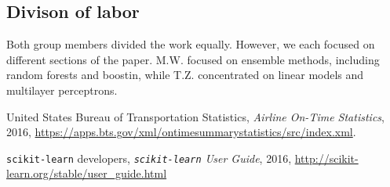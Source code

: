 \documentclass{article}
\begin{document}
\begin{multicols}{2}
\section{Divison of labor}

Both group members divided the work equally.
However, we each focused on different sections of the paper.
M.W. focused on ensemble methods, including random forests and boostin,
while T.Z. concentrated on linear models and multilayer perceptrons.

\begin{thebibliography}{4}
  United States Bureau of Transportation Statistics,
  \emph{Airline On-Time Statistics},
  2016,
  \url{https://apps.bts.gov/xml/ontimesummarystatistics/src/index.xml}.
  
  \texttt{scikit-learn} developers,
  \emph{\texttt{scikit-learn} User Guide},
  2016,
  \url{http://scikit-learn.org/stable/user_guide.html}
\end{thebibliography}


\end{multicols}
\end{document}
